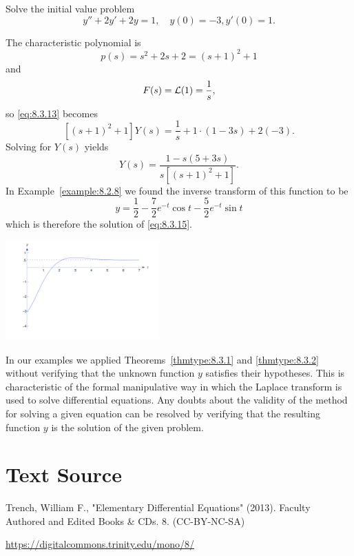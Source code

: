 \documentclass{ximera}
\begin{document}


\begin{example}\label{example:8.3.4}
 Solve the initial value problem
\begin{equation}\label{eq:8.3.15}
y''+2y'+2y=1, \quad   y(0)=-3,  y'(0)=1.
\end{equation}
\begin{explanation}
The characteristic polynomial is
$$
p(s)=s^2+2s+2=(s+1)^2+1
$$
and
$$
F(s)={\cal L}(1)=\frac{1}{s},
$$
so \eqref{eq:8.3.13} becomes
$$
\left[(s+1)^2+1\right] Y(s)=\frac{1}{s}+1\cdot(1-3s)+2(-3).
$$
Solving for $Y(s)$ yields
$$
Y(s)=\frac{1-s(5+3s)}{s\left[(s+1)^2+1\right]}.
$$
In Example~\ref{example:8.2.8}  we found the inverse transform of this
function to be
$$
y=\frac{1}{2}-\frac{7}{2}e^{-t}\cos t-\frac{5}{2}e^{-t}\sin t
$$
which is therefore  the solution of  \eqref{eq:8.3.15}.

\begin{image}
 \includegraphics[height=1.5in]{fig080302.jpg}
\end{image}

\end{explanation}
\end{example}

\begin{remark}
In our examples we applied Theorems~\ref{thmtype:8.3.1} and
\ref{thmtype:8.3.2}
without verifying that the unknown function $y$ satisfies their
hypotheses. This is characteristic of the formal manipulative way in
which the Laplace transform is used to solve differential equations.
Any doubts about the validity of the method for solving a given
equation can be resolved by verifying that the resulting function $y$
is  the solution of the given problem.
\end{remark}


\section*{Text Source}
Trench, William F., "Elementary Differential Equations" (2013). Faculty Authored and Edited Books \& CDs. 8. (CC-BY-NC-SA)

\href{https://digitalcommons.trinity.edu/mono/8/}{https://digitalcommons.trinity.edu/mono/8/}
\end{document}
